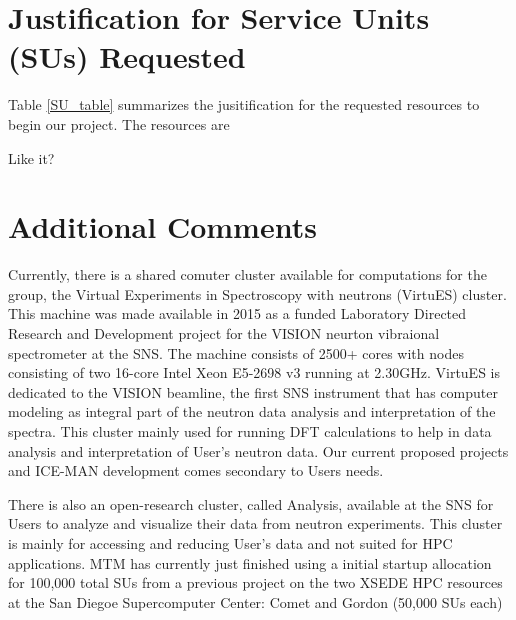 \documentclass{proposalnsf}
\begin{document}
\section*{Justification for Service Units (SUs) Requested}

Table \ref{SU_table} summarizes the jusitification for the requested resources to begin our project. The resources are 

\begin{table}[H]
  \caption{Summary of requested service units for projects}\label{SU_table}
\end{table}

Like it?

\section*{Additional Comments}
Currently, there is a shared comuter cluster available for computations for the group, the Virtual Experiments  in Spectroscopy  with neutrons (VirtuES) cluster. This machine was made available in 2015 as a funded Laboratory Directed Research and Development project for the VISION neurton vibraional spectrometer at the SNS. The machine consists of 2500+ cores with nodes consisting of two 16-core Intel Xeon E5-2698 v3 running at 2.30GHz. VirtuES is dedicated to the VISION beamline, the first SNS instrument that has computer modeling as integral part of the neutron data analysis and interpretation of the spectra. This cluster mainly used for running DFT calculations to help in data analysis and interpretation of User's neutron data. Our current proposed projects and ICE-MAN development comes secondary to Users needs.

There is also an open-research cluster, called Analysis, available at the SNS for Users to analyze and visualize their data from neutron experiments. This cluster is mainly for accessing and reducing User's data and not suited for HPC applications. MTM has currently just finished using a initial startup allocation for 100,000 total SUs from a previous project on the two XSEDE HPC resources at the San Diegoe Supercomputer Center: Comet and Gordon (50,000 SUs each)




\end{document}
